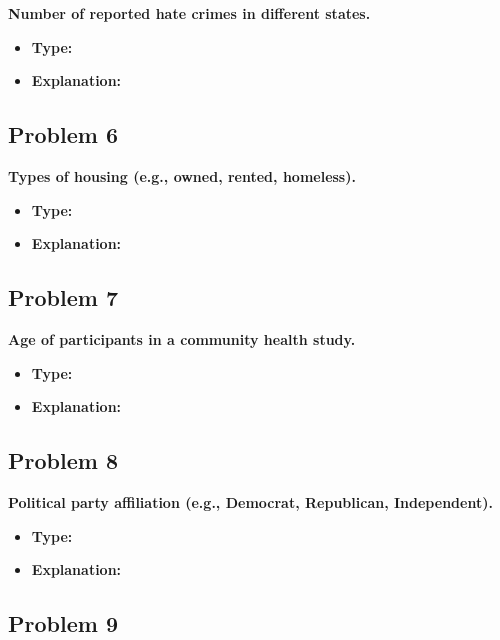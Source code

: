 \documentclass[
  letterpaper,
  DIV=11,
  numbers=noendperiod]{scrreprt}
\begin{document}
\textbf{Number of reported hate crimes in different states.}

\begin{itemize}
\item
  \textbf{Type:}
\item
  \textbf{Explanation:}
\end{itemize}

\subsection*{Problem 6}\label{problem-6}

\textbf{Types of housing (e.g., owned, rented, homeless).}

\begin{itemize}
\item
  \textbf{Type:}
\item
  \textbf{Explanation:}
\end{itemize}

\subsection*{Problem 7}\label{problem-7}

\textbf{Age of participants in a community health study.}

\begin{itemize}
\item
  \textbf{Type:}
\item
  \textbf{Explanation:}
\end{itemize}

\subsection*{Problem 8}\label{problem-8}

\textbf{Political party affiliation (e.g., Democrat, Republican,
Independent).}

\begin{itemize}
\item
  \textbf{Type:}
\item
  \textbf{Explanation:}
\end{itemize}

\subsection*{Problem 9}\label{problem-9}
\end{document}
